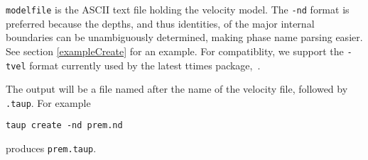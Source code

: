 \texttt{modelfile} is the ASCII text file holding the velocity model.
The \texttt{-nd} format is preferred
because the depths, and thus identities, of the major internal boundaries can
be unambiguously determined, making phase name parsing easier.
See section \ref{exampleCreate} for an example.
For compatiblity, we support the \texttt{-tvel} format
currently used by the latest ttimes package,~\cite{kennett:ak135}.

The output will be a file named after the name of the
velocity file, followed by \texttt{.taup}. For example

\texttt{taup create -nd prem.nd}

produces \texttt{prem.taup}.
